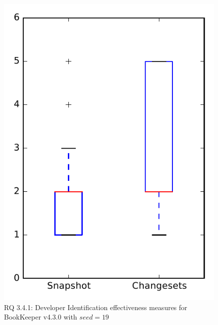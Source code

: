 
\begin{figure}
\centering
\includegraphics[height=0.4\textheight]{figures/dit_seed/rq1_bookkeeper_19}
\caption{RQ 3.4.1: Developer Identification effectiveness measures for BookKeeper v4.3.0 with $seed=19$}
\label{fig:dit_seed:rq1:bookkeeper}
\end{figure}
